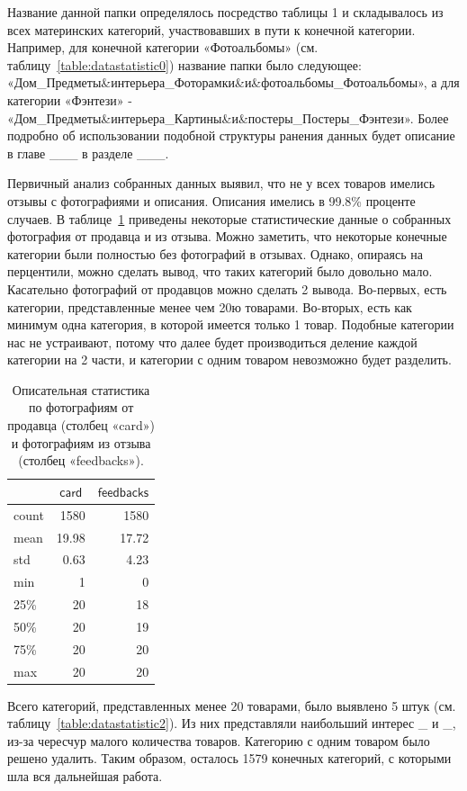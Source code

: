\documentclass[a4paper,12pt]{extarticle}
\begin{document}
Название данной папки определялось посредство таблицы 1 и складывалось из всех материнских категорий, участвовавших в пути к конечной категории. Например, для конечной категории «Фотоальбомы» (см. таблицу~\ref{table:datastatistic0}) название папки было следующее: «Дом\_Предметы\&интерьера\_Фоторамки\&и\&фотоальбомы\_Фотоальбомы», а для категории «Фэнтези» - «Дом\_Предметы\&интерьера\_Картины\&и\&постеры\_Постеры\_Фэнтези». Более подробно об использовании подобной структуры ранения данных будет описание в главе \_\_\_ в разделе \_\_\_.

Первичный анализ собранных данных выявил, что не у всех товаров имелись отзывы с фотографиями и описания. Описания имелись в 99.8\% проценте случаев. В таблице~\ref{table:datastatistic1} приведены некоторые статистические данные о собранных фотография от продавца и из отзыва. Можно заметить, что некоторые конечные категории были полностью без фотографий в отзывах. Однако, опираясь на перцентили, можно сделать вывод, что таких категорий было довольно мало. Касательно фотографий от продавцов можно сделать 2 вывода. Во-первых, есть категории, представленные менее чем 20ю товарами. Во-вторых, есть как минимум одна категория, в которой имеется только 1 товар. Подобные категории нас не устраивают, потому что далее будет производиться деление каждой категории на 2 части, и категории с одним товаром невозможно будет разделить.

\begin{table}[ht]
	\caption{Описательная статистика по фотографиям от продавца (столбец «card») и фотографиям из отзыва (столбец «feedbacks»).}
	\label{table:datastatistic1}
	\footnotesize
	\centering
	\begin{tabular}{l|rr}
		\toprule
		{} & \multicolumn{1}{c}{$\mathsf{card}$} & \multicolumn{1}{c}{$\mathsf{feedbacks}$}\\
		\midrule
		count &	1580  & 1580\\
		mean  & 19.98 & 17.72\\
		std   & 0.63  &	4.23\\
		min   &	1     &	0\\
		25\%  &	20    &	18\\
		50\%  &	20    &	19\\
		75\%  &	20    &	20\\
		max   &	20    &	20\\
		\bottomrule
	\end{tabular}
\end{table}

Всего категорий, представленных менее 20 товарами, было выявлено 5 штук (см. таблицу~\ref{table:datastatistic2}). Из них представляли наибольший интерес \_ и \_, из-за чересчур малого количества товаров. Категорию с одним товаром было решено удалить. Таким образом, осталось 1579 конечных категорий, с которыми шла вся дальнейшая работа.
\end{document}
